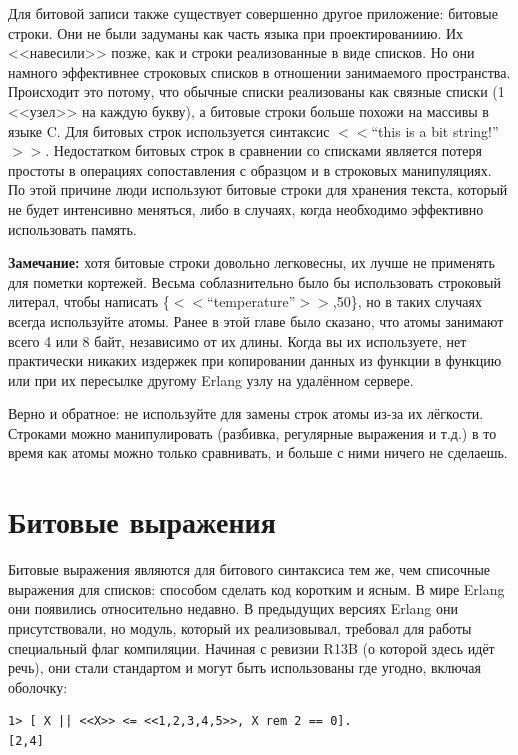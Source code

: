 \documentclass[a4paper,12pt]{report}
\newcommand{\ops}{\colorbox{lgreen}}
\begin{document}
Для битовой записи также существует совершенно другое приложение: битовые строки. Они не были задуманы как часть языка при проектированиию. Их <<навесили>> позже, как и строки реализованные в виде списков. Но они намного эффективнее строковых списков в отношении занимаемого пространства. Происходит это потому, что обычные списки реализованы как связные списки (1 <<узел>> на каждую букву), а битовые строки больше похожи на массивы в языке C. Для битовых строк используется синтаксис \ops{$<<$``this is a bit string!''$>>$}. Недостатком битовых строк в сравнении со списками является потеря простоты в операциях сопоставления с образцом и в строковых манипуляциях. По этой причине люди используют битовые строки для хранения текста, который не будет интенсивно меняться, либо в случаях, когда необходимо эффективно использовать память.\\ 
\colorbox{lgray}{
    \begin{minipage}{\linewidth}
        \textbf{Замечание:} хотя битовые строки довольно легковесны, их лучше не применять для пометки кортежей. Весьма соблазнительно было бы использовать строковый литерал, чтобы написать \ops{\{$<<$``temperature''$>>$,50\}}, но в таких случаях всегда используйте атомы. Ранее в этой главе было сказано, что атомы занимают всего 4 или 8 байт, независимо от их длины. Когда вы их используете, нет практически никаких издержек при копировании данных из функции в функцию или при их пересылке другому Erlang узлу на удалённом сервере.
        
        Верно и обратное: не используйте для замены строк атомы из\--за их лёгкости. Строками можно манипулировать (разбивка, регулярные выражения и т.д.) в то время как атомы можно только сравнивать, и больше с ними ничего не сделаешь.
    \end{minipage}
}
\section{Битовые выражения}
Битовые выражения являются для битового синтаксиса тем же, чем списочные выражения для списков: способом сделать код коротким и ясным. В мире Erlang они появились относительно недавно. В предыдущих версиях Erlang они присутствовали, но модуль, который их реализовывал, требовал для работы специальный флаг компиляции. Начиная с ревизии R13B (о которой здесь идёт речь), они стали стандартом и могут быть использованы где угодно, включая оболочку:
\begin{lstlisting}[style=repl]
1> [ X || <<X>> <= <<1,2,3,4,5>>, X rem 2 == 0].    
[2,4]
\end{lstlisting}
\end{document}
